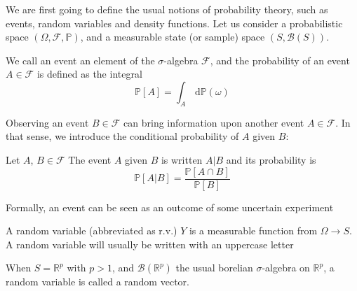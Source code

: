 \documentclass[a4paper,11pt]{article}
\newcommand{\Prob}{\mathbb{P}}
\theoremstyle{defi}
\numberwithin{thmCounter}{section}
\begin{document}
We are first going to define the usual notions of probability theory, such as events, random variables and density functions.
Let us consider a probabilistic space $(\Omega, \mathcal{F}, \Prob)$, and a measurable state (or sample) space $(S, \mathcal{B}(S))$.
\begin{definition}
   We call an event an element of the $\sigma$-algebra $\mathcal{F}$, and the probability of an event $A\in \mathcal{F}$ is defined as the integral
  \begin{equation}
    \Prob[A] = \int_{A} \,\mathrm{d}\Prob(\omega)
  \end{equation}
\end{definition}
Observing an event $B \in \mathcal{F}$ can bring information upon another event $A\in \mathcal{F}$. In that sense, we introduce the conditional probability of $A$ given $B$:
\begin{definition}
  Let $A$, $B \in \mathcal{F}$
  The event $A$ given $B$ is written $A | B$ and its probability is
  \begin{equation}
    \Prob[A | B] = \frac{\Prob[A \cap B]}{\Prob[B]}
  \end{equation}
\end{definition}
Formally, an event can be seen as an outcome of some uncertain experiment
\begin{definition}
  A random variable (abbreviated as r.v.) $Y$ is a measurable function from $\Omega \longrightarrow S$. A random variable will usually be written with an uppercase letter
\end{definition}
\begin{remark}
  When $S = \mathbb{R}^p$ with $p > 1$, and $\mathcal{B}(\mathbb{R}^p)$ the usual borelian $\sigma$-algebra on $\mathbb{R}^p$, a random variable is called a random vector.
\end{remark}
\end{document}
